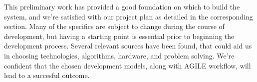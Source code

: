 This preliminary work has provided a good foundation on which to build the system, and we're satisfied with our project plan as detailed in the corresponding section. Many of the specifics are subject to change during the course of development, but having a starting point is essential prior to beginning the development process. Several relevant sources have been found, that could aid us in choosing technologies, algorithms, hardware, and problem solving. We're confident that the chosen development models, along with AGILE workflow, will lead to a succesful outcome.